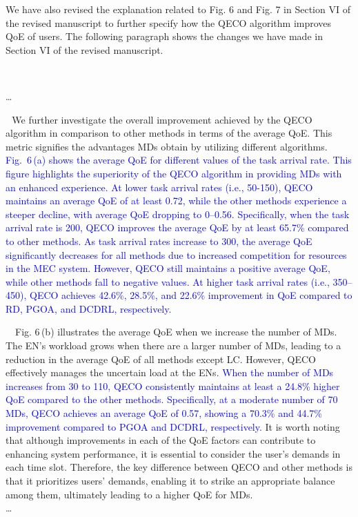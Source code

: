 \documentclass[12pt,draftclsnofoot,onecolumn]{IEEEtran}
\newcommand{\rev}[1]{{\color{blue}#1}} %
\newcommand{\rev}[1]{#1}
\newenvironment{my}[2]%
{\begin{list}{}%
{\setlength{\rightmargin}{#1}\setlength{\leftmargin}{#2}}%


 \item[]{}

} {\end{list}}
\begin{document}
\begin{enumerate}
We have also revised the explanation related to Fig. 6 and Fig. 7 in Section VI of the revised manuscript to further specify how the QECO algorithm improves QoE of users. The following paragraph shows the changes we have made in Section VI of the revised manuscript.
		\begin{my}{1cm}{1cm}
	\rev{
		{\ 
			
			\dots \color{black}
			
			\,\,\,\,We further investigate the overall improvement achieved by the QECO algorithm in comparison to other methods in terms of the average QoE. This metric signifies the advantages MDs obtain by utilizing different algorithms. \textcolor{blue}{Fig.~6\,(a) shows the average QoE for different values of the task arrival rate. This figure highlights the superiority of the QECO algorithm in providing MDs with an enhanced experience. At lower task arrival rates (i.e., 50-150), QECO maintains an average QoE of at least 0.72, while the other methods experience a steeper decline, with average QoE dropping to 0--0.56. Specifically, when the task arrival rate is 200, QECO improves the average QoE by at least 65.7\% compared to other methods. As task arrival rates increase to 300, the average QoE significantly decreases for all methods due to increased competition for resources in the MEC system. However, QECO still maintains a positive average QoE, while other methods fall to negative values. At higher task arrival rates (i.e., 350–450), QECO achieves 42.6\%, 28.5\%, and 22.6\% improvement in QoE compared to RD, PGOA, and DCDRL, respectively.} \vspace{3mm}
			
			\,\,\,\, Fig. 6\,(b) illustrates the average QoE when we increase the number of MDs. The EN's workload grows when there are a larger number of MDs, leading to a reduction in the average QoE of all methods except LC. However, QECO effectively manages the uncertain load at the ENs. \textcolor{blue}{When the number of MDs increases from 30 to 110, QECO consistently maintains at least a 24.8\% higher QoE compared to the other methods. Specifically, at a moderate number of 70 MDs, QECO achieves an average QoE of 0.57, showing a 70.3\% and 44.7\% improvement compared to PGOA and DCDRL, respectively.} It is worth noting that although improvements in each of the QoE factors can contribute to enhancing system performance, it is essential to consider the user's demands in each time slot. Therefore, the key difference between QECO and other methods is that it prioritizes users' demands, enabling it to strike an appropriate balance among them, ultimately leading to a higher QoE for MDs.
			\vspace{3mm}\\\dots }}
	

\end{my}
\end{enumerate}
\end{document}
